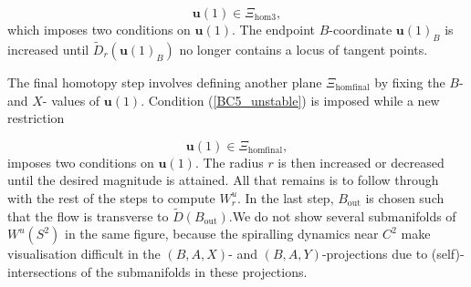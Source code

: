 \documentclass{ws-ijbc}
\begin{document}
\begin{equation}
\mathbf{u}(1) \in \Xi_{\mathrm{hom3}},
\label{BC8_unstable}
\end{equation}
\noindent
which imposes two conditions on $\mathbf{u}(1)$.  The endpoint $B$-coordinate $\mathbf{u}(1)_B$ is increased until $\widetilde{D}_r(\mathbf{u}(1)_B)$ no longer contains a locus of tangent points.

The final homotopy step involves defining another plane $\Xi_{\mathrm{homfinal}}$ by fixing the $B$- and $X$- values of $\mathbf{u}(1)$.  Condition (\ref{BC5_unstable}) is imposed while a new restriction

\begin{equation}
\mathbf{u}(1) \in \Xi_{\mathrm{homfinal}},
\label{BC9_unstable}
\end{equation}
\noindent
imposes two conditions on $\mathbf{u}(1)$.  The radius $r$ is then increased or decreased until the desired magnitude is attained.  All that remains is to follow through with the rest of the steps to compute $W^u_r$.  In the last step, $B_{\text{out}}$ is chosen such that the flow is transverse to $\widetilde{D}(B_{\text{out}})$.We do not show several submanifolds of $W^u(S^2)$ in the same figure, because the spiralling dynamics near $C^2$ make visualisation difficult in the $(B,A,X)$- and $(B,A,Y)$-projections due to (self)-intersections of the submanifolds in these projections.
\end{document}
